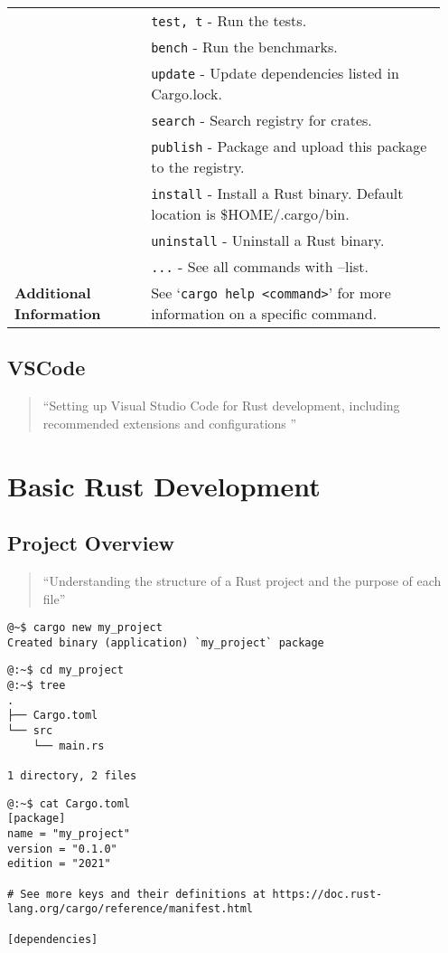 \begin{longtable}{|p{0.3\linewidth}|p{0.65\linewidth}|}
	& \texttt{test, t} - Run the tests. \\
	& \texttt{bench} - Run the benchmarks. \\
	& \texttt{update} - Update dependencies listed in Cargo.lock. \\
	& \texttt{search} - Search registry for crates. \\
	& \texttt{publish} - Package and upload this package to the registry. \\
	& \texttt{install} - Install a Rust binary. Default location is \$HOME/.cargo/bin. \\
	& \texttt{uninstall} - Uninstall a Rust binary. \\
	& \texttt{...} - See all commands with --list. \\
	\hline
	\textbf{Additional Information} & See `\texttt{cargo help <command>}' for more information on a specific command. \\
\end{longtable}
\newpage
\subsection{VSCode}
\begin{quote}
``Setting up Visual Studio Code for Rust development, including recommended extensions and configurations                                                                                                                                                                                                                                                                    ''
\end{quote}
\newpage
\section{Basic Rust Development}
\subsection{Project Overview}
\begin{quote}
``Understanding the structure of a Rust project and the purpose of each file''
\end{quote}
\begin{lstlisting}[style=zsh]
@~$ cargo new my_project
Created binary (application) `my_project` package
\end{lstlisting}
\begin{lstlisting}[style=zsh]
@:~$ cd my_project
@:~$ tree
.
├── Cargo.toml
└── src
	└── main.rs

1 directory, 2 files
\end{lstlisting}
\begin{lstlisting}[style=zsh]
@:~$ cat Cargo.toml        
[package]
name = "my_project"
version = "0.1.0"
edition = "2021"

# See more keys and their definitions at https://doc.rust-lang.org/cargo/reference/manifest.html

[dependencies]
\end{lstlisting}

